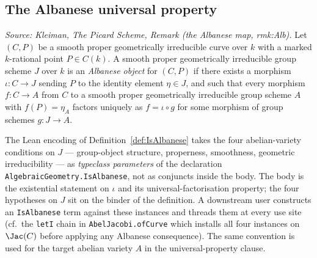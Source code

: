 \subsection{The Albanese universal property}
\begin{definition}
  \label{def:IsAlbanese}
  \textit{Source: Kleiman, The Picard Scheme, Remark (the Albanese map, rmk:Alb).}
  Let \((C, P)\) be a smooth proper geometrically irreducible curve over \(k\) with a marked \(k\)-rational point \(P \in C(k)\). A smooth proper geometrically irreducible group scheme \(J\) over \(k\) is an \emph{Albanese object} for \((C, P)\) if there exists a morphism \(\iota \colon C \to J\) sending \(P\) to the identity element \(\eta \in J\), and such that every morphism \(f \colon C \to A\) from \(C\) to a smooth proper geometrically irreducible group scheme \(A\) with \(f(P) = \eta_A\) factors uniquely as \(f = \iota \circ g\) for some morphism of group schemes \(g \colon J \to A\).
\end{definition}
\begin{remark}
  \label{rem:IsAlbanese_typeclasses}
  The Lean encoding of Definition~\ref{def:IsAlbanese} takes the four abelian-variety conditions on \(J\) --- group-object structure, properness, smoothness, geometric irreducibility --- as \emph{typeclass parameters} of the declaration \texttt{AlgebraicGeometry.IsAlbanese}, not as conjuncts inside the body. The body is the existential statement on \(\iota\) and its universal-factorisation property; the four hypotheses on \(J\) sit on the binder of the definition. A downstream user constructs an \texttt{IsAlbanese} term against these instances and threads them at every use site (cf.\ the \texttt{letI} chain in \texttt{AbelJacobi.ofCurve} which installs all four instances on \(\Jac(C)\) before applying any Albanese consequence). The same convention is used for the target abelian variety \(A\) in the universal-property clause.
\end{remark}
